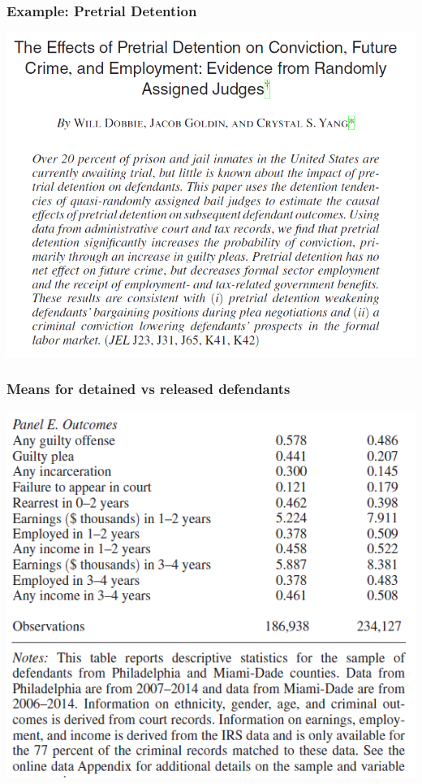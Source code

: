 \begin{frame}
  \frametitle{Example: Pretrial Detention}
  \begin{center}
    \includegraphics[height=.8\textheight]{./resources/DobbieAbstract}
  \end{center}  
\end{frame}

\begin{frame}
  \frametitle{Means for detained vs released defendants}
  \begin{center}
    \includegraphics[height=.8\textheight]{./resources/DobbieStats}
  \end{center}  
\end{frame}


